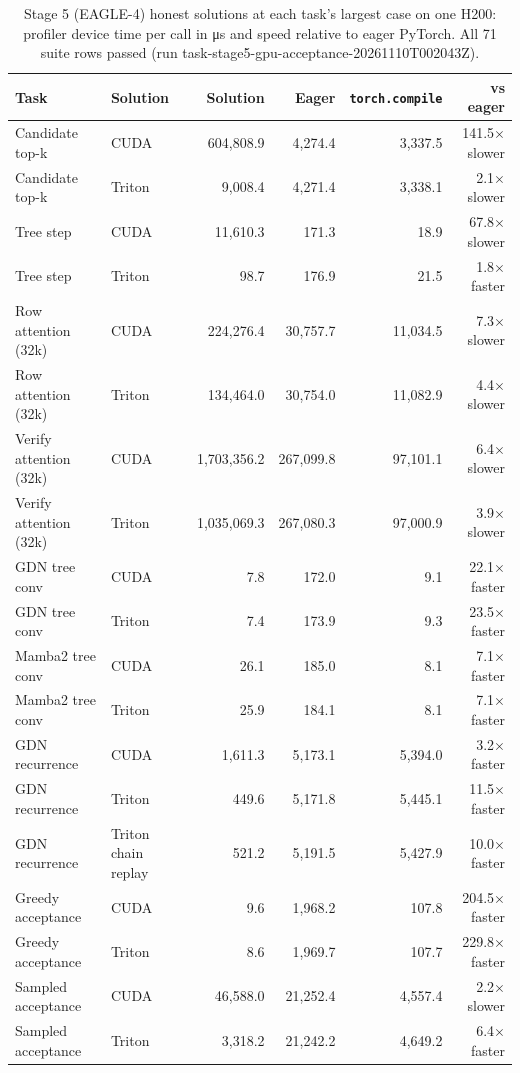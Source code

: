 \begin{table}[t]
\centering
\small
\caption{Stage 5 (EAGLE-4) honest solutions at each task's largest case on one H200: profiler device time per call in \si{\micro\second} and speed relative to eager PyTorch. All 71 suite rows passed (run task-stage5-gpu-acceptance-20261110T002043Z).}
\label{tab:stage5-largest}
\begin{tabular}{llrrrr}
\toprule
Task & Solution & Solution & Eager & \texttt{torch.compile} & vs eager \\
\midrule
Candidate top-k & CUDA & 604,808.9 & 4,274.4 & 3,337.5 & 141.5$\times$ slower \\
Candidate top-k & Triton & 9,008.4 & 4,271.4 & 3,338.1 & 2.1$\times$ slower \\
Tree step & CUDA & 11,610.3 & 171.3 & 18.9 & 67.8$\times$ slower \\
Tree step & Triton & 98.7 & 176.9 & 21.5 & 1.8$\times$ faster \\
Row attention (32k) & CUDA & 224,276.4 & 30,757.7 & 11,034.5 & 7.3$\times$ slower \\
Row attention (32k) & Triton & 134,464.0 & 30,754.0 & 11,082.9 & 4.4$\times$ slower \\
Verify attention (32k) & CUDA & 1,703,356.2 & 267,099.8 & 97,101.1 & 6.4$\times$ slower \\
Verify attention (32k) & Triton & 1,035,069.3 & 267,080.3 & 97,000.9 & 3.9$\times$ slower \\
GDN tree conv & CUDA & 7.8 & 172.0 & 9.1 & 22.1$\times$ faster \\
GDN tree conv & Triton & 7.4 & 173.9 & 9.3 & 23.5$\times$ faster \\
Mamba2 tree conv & CUDA & 26.1 & 185.0 & 8.1 & 7.1$\times$ faster \\
Mamba2 tree conv & Triton & 25.9 & 184.1 & 8.1 & 7.1$\times$ faster \\
GDN recurrence & CUDA & 1,611.3 & 5,173.1 & 5,394.0 & 3.2$\times$ faster \\
GDN recurrence & Triton & 449.6 & 5,171.8 & 5,445.1 & 11.5$\times$ faster \\
GDN recurrence & Triton chain replay & 521.2 & 5,191.5 & 5,427.9 & 10.0$\times$ faster \\
Greedy acceptance & CUDA & 9.6 & 1,968.2 & 107.8 & 204.5$\times$ faster \\
Greedy acceptance & Triton & 8.6 & 1,969.7 & 107.7 & 229.8$\times$ faster \\
Sampled acceptance & CUDA & 46,588.0 & 21,252.4 & 4,557.4 & 2.2$\times$ slower \\
Sampled acceptance & Triton & 3,318.2 & 21,242.2 & 4,649.2 & 6.4$\times$ faster \\
\bottomrule
\end{tabular}
\end{table}
